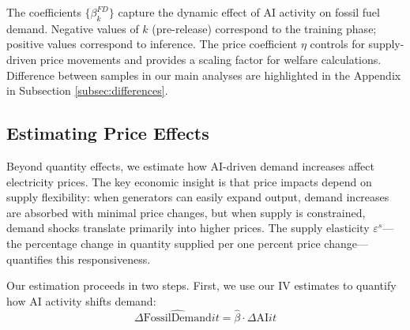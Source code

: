 \documentclass[a4paper,fleqn,longmktitle]{cas-sc}
\newcommand{\nb}[1]{\textcolor{blue}{NB[#1]}}
\begin{document}
The coefficients $\{\beta_k^{FD}\}$ capture the dynamic effect of AI activity on fossil fuel demand. Negative values of $k$ (pre-release) correspond to the training phase; positive values correspond to inference. The price coefficient $\eta$ controls for supply-driven price movements and provides a scaling factor for welfare calculations. Difference between samples in our main analyses are highlighted in the Appendix in Subsection \ref{subsec:differences}.





\subsection{Estimating Price Effects}\label{PriceEffects}
Beyond quantity effects, we estimate how AI-driven demand increases affect electricity prices. The key economic insight is that price impacts depend on supply flexibility: when generators can easily expand output, demand increases are absorbed with minimal price changes, but when supply is constrained, demand shocks translate primarily into higher prices. The supply elasticity $\varepsilon^s$—the percentage change in quantity supplied per one percent price change—quantifies this responsiveness.

Our estimation proceeds in two steps. First, we use our IV estimates to quantify how AI activity shifts demand:
\begin{equation}
\Delta \widehat{\text{FossilDemand}}{it} = \hat{\beta} \cdot \Delta \text{AI}{it}
\label{eq:demand-change}
\end{equation}
\end{document}
